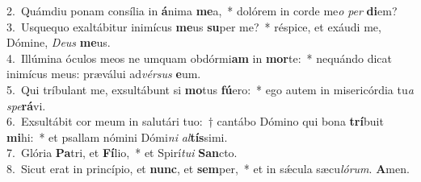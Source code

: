 {2.~}Quámdiu ponam consília in \textbf{á}nima \textbf{me}a,~* dolórem in corde me\textit{o} \textit{per} \textbf{di}em?\\
{3.~}Usquequo exaltábitur inimícus \textbf{me}us \textbf{su}per me?~* réspice, et exáudi me, Dómine, \textit{De}\textit{us} \textbf{me}us.\\
{4.~}Illúmina óculos meos ne umquam obdórmi\textbf{am} in \textbf{mor}te:~* nequándo dicat inimícus meus: præválui ad\textit{vér}\textit{sus} \textbf{e}um.\\
{5.~}Qui tríbulant me, exsultábunt si \textbf{mo}tus \textbf{fú}ero:~* ego autem in misericórdia tu\textit{a} \textit{spe}\textbf{rá}vi.\\
{6.~}Exsultábit cor meum in salutári tuo:~† cantábo Dómino qui bona \textbf{trí}buit \textbf{mi}hi:~* et psallam nómini Dómi\textit{ni} \textit{al}\textbf{tís}simi.\\
{7.~}Glória \textbf{Pa}tri, et \textbf{Fí}lio,~* et Spirí\textit{tu}\textit{i} \textbf{San}cto.\\
{8.~}Sicut erat in princípio, et \textbf{nunc}, et \textbf{sem}per,~* et in sǽcula sæcu\textit{ló}\textit{rum}. \textbf{A}men.\\

